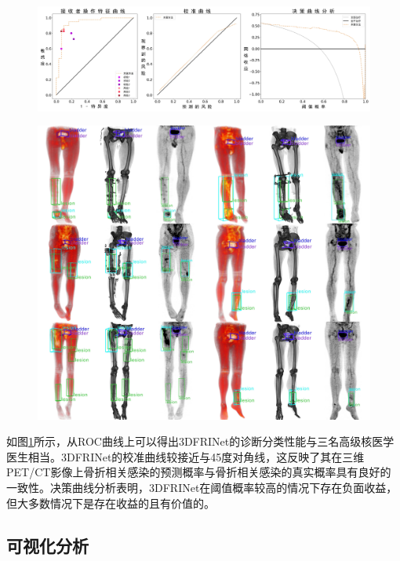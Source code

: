 \begin{figure}[t]
  \centering
  \includegraphics[width=\textwidth]{figures/chap04_eval.jpg}
  \label{fig:chap04_eval}
\end{figure}

\begin{figure}[b]
  \centering
  \includegraphics[width=\textwidth,keepaspectratio]{figures/chap04_vis.jpg}
  \label{fig:chap04_vis}
\end{figure}

如图\ref{fig:chap04_eval}所示，从ROC曲线上可以得出3DFRINet的诊断分类性能与三名高级核医学医生相当。3DFRINet的校准曲线较接近与45度对角线，这反映了其在三维PET/CT影像上骨折相关感染的预测概率与骨折相关感染的真实概率具有良好的一致性。决策曲线分析表明，3DFRINet在阈值概率较高的情况下存在负面收益，但大多数情况下是存在收益的且有价值的。


\subsection{可视化分析}

